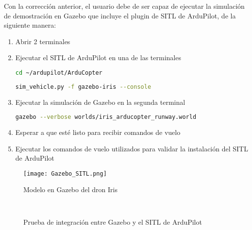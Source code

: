 Con la corrección anterior, el usuario debe de ser capaz de ejecutar la simulación de demostración en Gazebo que incluye el plugin de SITL de ArduPilot, de la siguiente manera:

\begin{enumerate}
    \item Abrir 2 terminales
    \item Ejecutar el SITL de ArduPilot en una de las terminales
    \begin{lstlisting}[language = bash]
        cd ~/ardupilot/ArduCopter
    \end{lstlisting}  
    \begin{lstlisting}[language = bash]
        sim_vehicle.py -f gazebo-iris --console
    \end{lstlisting} 
    \item Ejecutar la simulación de Gazebo en la segunda terminal
    \begin{lstlisting}[language = bash]
        gazebo --verbose worlds/iris_arducopter_runway.world
    \end{lstlisting} 
    \item Esperar a que esté listo para recibir comandos de vuelo
    \item Ejecutar los comandos de vuelo utilizados para validar la instalación del SITL de ArduPilot
\end{enumerate}

\begin{figure}[ht]
    \centering
    \texttt{[image: Gazebo\_SITL.png]}
    \caption{Modelo en Gazebo del dron Iris}
    \label{fig:Gazebo_SITL}
\end{figure}

\begin{figure}[ht]
    \centering
    \hfill
    \\
    \hfill
    \caption{Prueba de integración entre Gazebo y el SITL de ArduPilot}
    \label{fig:Gazebo_Ardupilot}
\end{figure}

